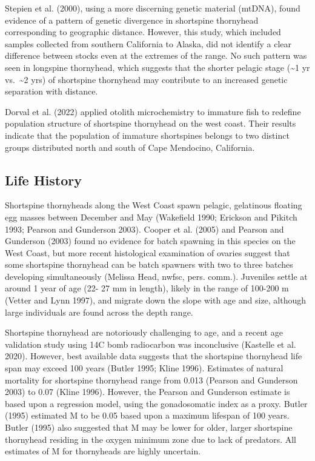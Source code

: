 \documentclass[11pt,
  letterpaper,
]{article}
\begin{document}
Stepien et al. (2000), using a more discerning genetic material (mtDNA), found evidence of a pattern of genetic divergence in shortspine thornyhead corresponding to geographic distance. However, this study, which included samples collected from southern California to Alaska, did not identify a clear difference between stocks even at the extremes of the range. No such pattern was seen in longspine thornyhead, which suggests that the shorter pelagic stage (\textasciitilde1 yr vs.~\textasciitilde2 yrs) of shortspine thornyhead may contribute to an increased genetic separation with distance.

Dorval et al. (2022) applied otolith microchemistry to immature fish to redefine population structure of shortspine thornyhead on the west coast. Their results indicate that the population of immature shortspines belongs to two distinct groups distributed north and south of Cape Mendocino, California.

\hypertarget{life-history}{%
\subsection{Life History}\label{life-history}}

Shortspine thornyheads along the West Coast spawn pelagic, gelatinous floating egg masses between December and May (Wakefield 1990; Erickson and Pikitch 1993; Pearson and Gunderson 2003). Cooper et al. (2005) and Pearson and Gunderson (2003) found no evidence for batch spawning in this species on the West Coast, but more recent histological examination of ovaries suggest that some shortspine thornyhead can be batch spawners with two to three batches developing simultaneously (Melissa Head, \gls{nwfsc}, pers. comm.). Juveniles settle at around 1 year of age (22- 27 mm in length), likely in the range of 100-200 m (Vetter and Lynn 1997), and migrate down the slope with age and size, although large individuals are found across the depth range.

Shortspine thornyhead are notoriously challenging to age, and a recent age validation study using 14C bomb radiocarbon was inconclusive (Kastelle et al. 2020). However, best available data suggests that the shortspine thornyhead life span may exceed 100 years (Butler 1995; Kline 1996). Estimates of natural mortality for shortspine thornyhead range from 0.013 (Pearson and Gunderson 2003) to 0.07 (Kline 1996). However, the Pearson and Gunderson estimate is based upon a regression model, using the gonadosomatic index as a proxy. Butler (1995) estimated M to be 0.05 based upon a maximum lifespan of 100 years. Butler (1995) also suggested that M may be lower for older, larger shortspine thornyhead residing in the oxygen minimum zone due to lack of predators. All estimates of M for thornyheads are highly uncertain.
\end{document}
